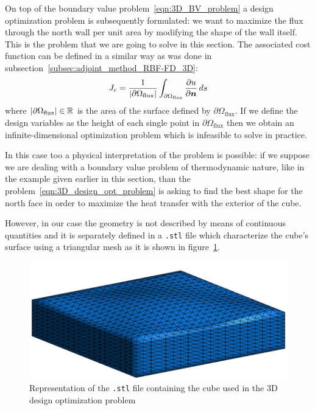 On top of the boundary value problem~\eqref{eqn:3D_BV_problem} a design optimization problem is subsequently formulated: we want to maximize the flux through the north wall per unit area by modifying the shape of the wall itself. This is the problem that we are going to solve in this section. The associated cost function can be defined in a similar way as was done in subsection~\vref{subsec:adjoint_method_RBF-FD_3D}:
\begin{equation}
	\label{eqn:continuous_3D_cost_function_results}
	J_c = \frac{1}{\lvert\partial\Omega_\text{flux}\rvert} \int_{\partial\Omega_\textup{flux}} \frac{\partial u}{\partial \boldsymbol{n}} \, ds
\end{equation}
where $\lvert\partial\Omega_\text{flux}\rvert \in \mathbb{R}$ is the area of the surface defined by $\partial\Omega_\text{flux}$.
If we define the design variables as the height of each single point in $\partial\Omega_\text{flux}$ then we obtain an infinite-dimensional optimization problem which is infeasible to solve in practice.  %

In this case too a physical interpretation of the problem is possible: if we suppose we are dealing with a boundary value problem of thermodynamic nature, like in the example given earlier in this section, than the problem~\eqref{eqn:3D_design_opt_problem} is asking to find the best shape for the north face in order to maximize the heat transfer with the exterior of the cube.

\medskip
However, in our case the geometry is not described by means of continuous quantities and it is separately defined in a \verb|.stl| file which characterize the cube's surface using a triangular mesh as it is shown in figure~\ref{fig:3D_cube_stl_initial}.

\begin{figure}
	\centering
	\includegraphics[width=.5\textwidth]{img/3D_cube_as_stl_cropped_1}
	\caption{Representation of the \texttt{.stl} file containing the cube used in the $3$D design optimization problem}
	\label{fig:3D_cube_stl_initial}
\end{figure}

